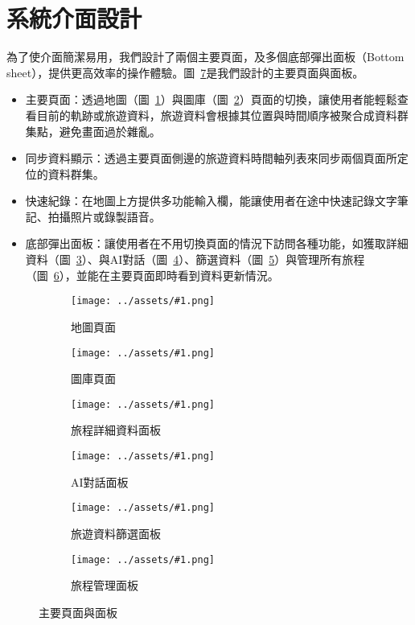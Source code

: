 
\newcommand{\customsubfig}[2]{
  \begin{subfigure}[t]{0.14\textwidth}
    \centering
    \texttt{[image: ../assets/\#1.png]}
    \caption{#2}
    \label{#2}
  \end{subfigure}
}

\section{系統介面設計}

為了使介面簡潔易用，我們設計了兩個主要頁面，及多個底部彈出面板（Bottom sheet），提供更高效率的操作體驗。圖~\ref{主要頁面與面板}是我們設計的主要頁面與面板。

\begin{itemize}
  \item 主要頁面：透過地圖（圖~\ref{地圖頁面}）與圖庫（圖~\ref{圖庫頁面}）頁面的切換，讓使用者能輕鬆查看目前的軌跡或旅遊資料，旅遊資料會根據其位置與時間順序被聚合成資料群集點，避免畫面過於雜亂。
  \item 同步資料顯示：透過主要頁面側邊的旅遊資料時間軸列表來同步兩個頁面所定位的資料群集。
  \item 快速紀錄：在地圖上方提供多功能輸入欄，能讓使用者在途中快速記錄文字筆記、拍攝照片或錄製語音。
  \item 底部彈出面板：讓使用者在不用切換頁面的情況下訪問各種功能，如獲取詳細資料（圖~\ref{旅程詳細資料面板}）、與AI對話（圖~\ref{AI對話面板}）、篩選資料（圖~\ref{旅遊資料篩選面板}）與管理所有旅程（圖~\ref{旅程管理面板}），並能在主要頁面即時看到資料更新情況。
\end{itemize}

\begin{figure}[H]
  \centering
  \customsubfig{地圖頁面}{地圖頁面}
  \customsubfig{圖庫頁面}{圖庫頁面}
  \customsubfig{旅程詳細資料面板-統計資料}{旅程詳細資料面板}
  \customsubfig{AI對話面板-聊天}{AI對話面板}
  \customsubfig{旅遊資料篩選面板}{旅遊資料篩選面板}
  \customsubfig{旅程管理面板}{旅程管理面板}
  \caption{主要頁面與面板}
  \label{主要頁面與面板}
\end{figure}
